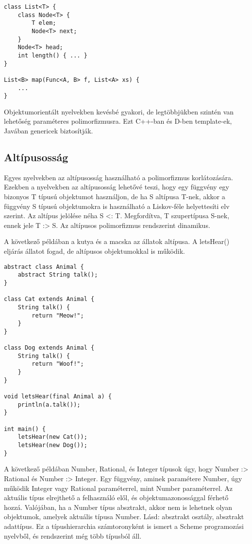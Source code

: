 \documentclass[margin=0px]{article}
\begin{document}
\begin{verbatim}
class List<T> {
    class Node<T> {
        T elem;
        Node<T> next;
    }
    Node<T> head;
    int length() { ... }
}

List<B> map(Func<A, B> f, List<A> xs) {
    ...
}
\end{verbatim}

Objektumorientált nyelvekben kevésbé gyakori, de legtöbbjükben szintén van lehetőség paraméteres polimorfizmusra. Ezt C++-ban és D-ben template-ek, Javában genericek biztosítják.

\subsection{Altípusosság}
Egyes nyelvekben az altípusosság használható a polimorfizmus korlátozására. Ezekben a nyelvekben az altípusosság lehetővé teszi, hogy egy függvény egy bizonyos T típusú objektumot használjon, de ha S altípusa T-nek, akkor a függvény S típusú objektumokra is használható a Liskov-féle helyettesíti elv szerint. Az altípus jelölése néha S <: T. Megfordítva, T szupertípusa S-nek, ennek jele T :> S. Az altípusos polimorfizmus rendszerint dinamikus.

A következő példában a kutya és a macska az állatok altípusa. A letsHear() eljárás állatot fogad, de altípusos objektumokkal is működik.

\begin{verbatim}
abstract class Animal {
    abstract String talk();
}

class Cat extends Animal {
    String talk() {
        return "Meow!";
    }
}

class Dog extends Animal {
    String talk() {
        return "Woof!";
    }
}

void letsHear(final Animal a) {
    println(a.talk());
}

int main() {
    letsHear(new Cat());
    letsHear(new Dog());
}
\end{verbatim}

A következő példában Number, Rational, és Integer típusok úgy, hogy Number :> Rational és Number :> Integer. Egy függvény, aminek paramétere Number, úgy működik Integer vagy Rational paraméterrel, mint Number paraméterrel. Az aktuális típus elrejthető a felhasználó elől, és objektumazonossággal férhető hozzá. Valójában, ha a Number típus absztrakt, akkor nem is lehetnek olyan objektumok, amelyek aktuális típusa Number. Lásd: absztrakt osztály, absztrakt adattípus. Ez a típushierarchia számtoronyként is ismert a Scheme programozási nyelvből, és rendszerint még több típusból áll.
\end{document}
